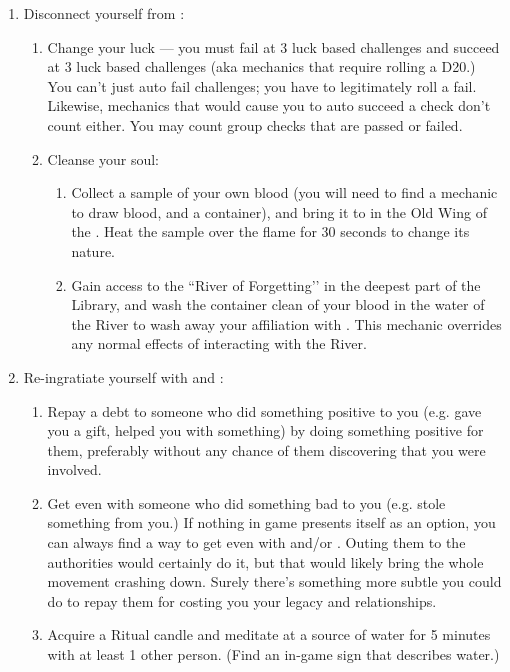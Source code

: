 \documentclass[green]{GL2020}
\begin{document}
\begin{enumerate}
  \item Disconnect yourself from \cGenesis{}:
  \begin{enumerate}
    \item Change your luck — you must fail at 3 luck based challenges and succeed at 3 luck based challenges (aka mechanics that require rolling a D20.) You can’t just auto fail challenges; you have to legitimately roll a fail. Likewise, mechanics that would cause you to auto succeed a check don’t count either. You may count group checks that are passed or failed.
    \item Cleanse your soul:
 	\begin{enumerate}
    \item Collect a sample of your own blood (you will need to find a mechanic to draw blood, and a container), and bring it to \sPFlameTwo{} in the Old Wing of the \pSc{}. Heat the sample over the flame for 30 seconds to change its nature.
    \item Gain access to the ``River of Forgetting’’ in the deepest part of the Library, and wash the container clean of your blood in the water of the River to wash away your affiliation with \cGenesis{}. This mechanic overrides any normal effects of interacting with the River.
  \end{enumerate}
  \end{enumerate}
  
  \item Re-ingratiate yourself with \cEbb{} and \cFlow{}:
  \begin{enumerate}
    \item Repay a debt to someone who did something positive to you (e.g. gave you a gift, helped you with something) by doing something positive for them, preferably without any chance of them discovering that you were involved.
    \item Get even with someone who did something bad to you (e.g. stole something from you.) If nothing in game presents itself as an option, you can always find a way to get even with \cChupLeader{\full} and/or \cChupSecond{\full}. Outing them to the authorities would certainly do it, but that would likely bring the whole movement crashing down. Surely there’s something more subtle you could do to repay them for costing you your legacy and relationships.
    \item Acquire a Ritual candle and meditate at a source of water for 5 minutes with at least 1 other person. (Find an in-game sign that describes water.)
      \end{enumerate}
  

\end{enumerate}
\end{document}
